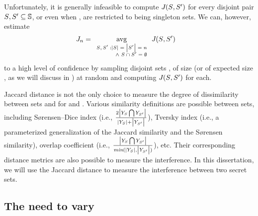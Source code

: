 Unfortunately, it is generally infeasible to compute
$J_{}(S_{}, S_{}')$ for every disjoint pair
$S_{}, S_{}' \subseteq \mathbb{S}$, or even
when \secretsSet{}, \secretsSetAlt{} are restricted to being singleton
sets.  We can, however, estimate
\begin{align}
\Jaccard{\secretsSetSize} & =
\avg_{\scriptsize \begin{array}{r@{\extracolsep{-0em}}r} \scriptsize \secretsSet{},\secretsSetAlt{}: & \setSize{\secretsSet{}} = \setSize{\secretsSetAlt{}} = \secretsSetSize \\ ~ & \wedge~\secretsSet{} \cap \secretsSetAlt{} = \emptyset\end{array}}
\Jaccard{}(\secretsSet{}, \secretsSetAlt{})
\label{dfn:jaccard}
\end{align}
to a high level of confidence by sampling disjoint sets \secretsSet{},
\secretsSetAlt{} of size \secretsSetSize (or of expected size
\secretsSetSize, as we will discuss in )
at random and computing $J_{}(S_{}, S_{}')$
for each.

Jaccard distance is not the only choice to measure the degree of
dissimilarity between sets \possibleDoubles{\secretsSet{}} and
\possibleDoubles{\secretsSetAlt{}} for \secretsSet{} and
\secretsSetAlt{}. Various similarity definitions are possible between
sets, including S{\o}rensen–Dice index (i.e.,
$\frac{2\left|{Y_{S_{}}\bigcap
Y_{S_{}'}}\right|}{\left|{Y_{S_{}}}\right|+\left|{Y_{S_{}'}}\right|}$),
Tversky index (i.e., a parameterized generalization of the Jaccard
similarity and the S{\o}rensen similarity), overlap coefficient (i.e.,
$\frac{\left|{Y_{S_{}}\bigcap
Y_{S_{}'}}\right|}{\textit{min}(\left|{Y_{S_{}}}\right|,\left|{Y_{S_{}'}}\right|)}$),
etc.  Their corresponding distance metrics are also possible to
measure the interference. In this dissertation, we will use the
Jaccard distance to measure the interference between two secret sets.

\subsection{The need to vary \secretsSetSize}
\label{sscf:sec:measurement:secretsSetSize}

